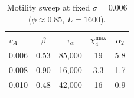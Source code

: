 \documentclass[aps,pre,twocolumn,superscriptaddress,longbibliography,floatfix]{revtex4-2}
\begin{document}
\begin{table}[h]
\caption{Motility sweep at fixed $\sigma\!=\!0.006$
  ($\phi\!\approx\!0.85$, $L\!=\!1600$).}
\label{tab:app-motility-sweep}
\begin{ruledtabular}
\begin{tabular}{lcccc}
$\bar{v}_A$ & $\beta$ & $\tau_\alpha$ & $\chi_4^{\max}$ & $\alpha_2$ \\
\midrule
0.006 & 0.53 & 85{,}000 & 19 & 5.8 \\
0.008 & 0.90 & 16{,}000 & 3.3 & 1.7 \\
0.010 & 0.48 & 42{,}000 & 16 & 0.9 \\
\end{tabular}
\end{ruledtabular}
\end{table}
\end{document}

